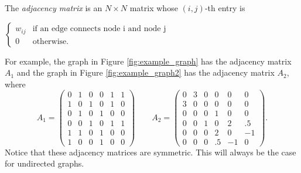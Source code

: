 \begin{definition} The \emph{adjacency matrix} is an $N \times N$ matrix whose $(i,j)$-th entry is
\begin{center}
	$ \begin{cases}  w_{ij} & \mbox{if an edge connects node i and node j} \\ 0 & \mbox{otherwise.} \end{cases}$
\end{center}
\end{definition}

For example, the graph in Figure \ref{fig:example_graph} has the adjacency matrix $A_1$ and the graph in Figure \ref{fig:example_graph2} has the adjacency matrix $A_2$, where
\[
A_1 = \begin{pmatrix}
0 & 1 & 0 & 0 & 1 & 1\\
1 & 0 & 1 & 0 & 1 & 0\\
0 & 1 & 0 & 1 & 0 & 0\\
0 & 0 & 1 & 0 & 1 & 1\\
1 & 1 & 0 & 1 & 0 & 0\\
1 & 0 & 0 & 1 & 0 & 0
\end{pmatrix} \qquad A_2 = 
 \begin{pmatrix}
0 & 3 & 0 & 0 & 0 & 0\\
3 & 0 & 0 & 0 & 0 & 0\\
0 & 0 & 0 & 1 & 0 & 0\\
0 & 0 & 1 & 0 & 2 & .5\\
0 & 0 & 0 & 2 & 0 & -1\\
0 & 0 & 0 & .5 & -1 & 0
\end{pmatrix}.
\]
Notice that these adjacency matrices are symmetric. This will always be the case for undirected graphs.

